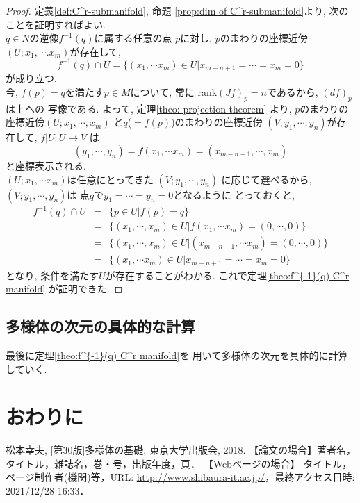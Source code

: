 \documentclass[a4j,12pt]{jarticle}
\theoremstyle{definition}
\begin{document}
\begin{proof}
    定義\ref{def:C^r-submanifold}, 命題
    \ref{prop:dim of C^r-submanifold}より, 
    次のことを証明すればよい.\\ 

    $q\in N$の逆像$f^{-1}(q)$に属する任意の点
    $p$に対し, $p$のまわりの座標近傍
    $(U;x_1,\cdots .x_m)$が存在して, 
    $$f^{-1}(q)\cap U
    =\{(x_1,\cdots x_m)\in U|
    x_{m-n+1}=\cdots =x_m=0\}$$
    が成り立つ. \\

    今, $f(p)=q$を満たす$p\in M$について, 常に
    rank$(Jf)_p=n$であるから, $(df)_p$は上への
    写像である. よって, 定理\ref{theo: projection theorem}
    より, $p$のまわりの座標近傍$(U;x_1,\cdots ,x_m)$
    と$q$($=f(p)$)のまわりの座標近傍
    $(V;y_1,\cdots ,y_n)$が存在して, $f|U:U\to V$
    は
    $$(y_1,\cdots ,y_n)=f(x_1,\cdots x_m)
    =(x_{m-n+1},\cdots ,x_m)$$
    と座標表示される. \\
    $(U;x_1,\cdots x_m)$は任意にとってきた
    $(V;y_1,\cdots ,y_n)$
    に応じて選べるから, $(V;y_1,\cdots ,y_n)$は
    点$q$で$y_1=\cdots =y_n=0$となるように
    とっておくと, 
    \begin{eqnarray*}
        f^{-1}(q)\cap U&=& \{p\in U|f(p)=q\}\\
        &=&\{(x_1,\cdots ,x_m)\in U|f(x_1,\cdots x_m)=(0,\cdots ,0)\}\\
        &=&\{(x_1,\cdots ,x_m)\in U|(x_{m-n+1},\cdots x_m)=(0,\cdots ,0)\}\\
        &=&\{(x_1,\cdots x_m)\in U|x_{m-n+1}=\cdots =x_m=0\}
    \end{eqnarray*}
    となり, 条件を満たす$U$が存在することがわかる. 
    これで定理\ref{theo:f^{-1}(q) C^r manifold}
    が証明できた. 
\end{proof}
\subsection{多様体の次元の具体的な計算}
最後に定理\ref{theo:f^{-1}(q) C^r manifold}を
用いて多様体の次元を具体的に計算していく. 

\newpage
%
\section{おわりに}
\newpage
\begin{thebibliography}{99}
 松本幸夫, [第30版]多様体の基礎, 東京大学出版会, 2018.
【論文の場合】著者名，タイトル，雑誌名，巻・号，出版年度，頁．
【Webページの場合】 タイトル，ページ制作者(機関)等，URL: \url{http://www.shibaura-it.ac.jp/}，最終アクセス日時: 2021/12/28 16:33．
\end{thebibliography}
\end{document}
